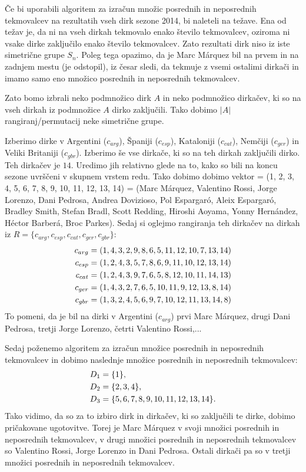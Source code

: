 \documentclass[a4paper, 12pt]{book}
\begin{document}
Če bi uporabili algoritem za izračun množic posrednih in neposrednih tekmovalcev na rezultatih vseh dirk sezone 2014, bi naleteli na težave. Ena od težav je, da ni na vseh dirkah tekmovalo enako število tekmovalcev, oziroma ni vsake dirke zaključilo enako število tekmovalcev. Zato rezultati dirk niso iz iste simetrične grupe $S_n$. Poleg tega opazimo, da je Marc Márquez bil na prvem in na zadnjem mestu (je odstopil), iz česar sledi, da tekmuje z vsemi ostalimi dirkači in imamo samo eno množico posrednih in neposrednih tekmovalcev.

Zato bomo izbrali neko podmnožico dirk $A$ in neko podmnožico dirkačev, ki so na vseh dirkah iz podmnožice $A$ dirko zaključili. Tako dobimo $|A|$ rangiranj/permutacij neke simetrične grupe.

Izberimo dirke v Argentini ($c_{arg}$), Španiji ($c_{esp}$), Kataloniji ($c_{cat}$), Nemčiji ($c_{ger}$) in Veliki Britaniji ($c_{gbr}$). Izberimo še vse dirkače, ki so na teh dirkah zaključili dirko. Teh dirkačev je $14$. Uredimo jih relativno glede na to, kako so bili na koncu sezone uvrščeni v skupnem vrstem redu. Tako dobimo dobimo vektor = (1, 2, 3, 4, 5, 6, 7, 8, 9, 10, 11, 12, 13, 14) = (Marc Márquez, Valentino Rossi, Jorge Lorenzo, Dani Pedrosa, Andrea Dovizioso, Pol Espargaró, Aleix Espargaró, Bradley Smith, Stefan Bradl, Scott Redding, Hiroshi Aoyama, Yonny Hernández, Héctor Barberá, Broc Parkes). Sedaj si oglejmo rangiranja teh dirkačev na dirkah iz $R = \{ c_{arg}, c_{esp}, c_{cat}, c_{ger}, c_{gbr} \}$:
\begin{align}
    c_{arg} &= (1, 4, 3, 2, 9, 8, 6, 5, 11, 12, 10, 7, 13, 14) \notag\\
    c_{esp} &= (1, 2, 4, 3, 5, 7, 8, 6, 9, 11, 10, 12, 13, 14) \notag\\
    c_{cat} &= (1, 2, 4, 3, 9, 7, 6, 5, 8, 12, 10, 11, 14, 13) \notag\\
    c_{ger} &= (1, 4, 3, 2, 7, 6, 5, 10, 11, 9, 12, 13, 8, 14) \notag\\
    c_{gbr} &= (1, 3, 2, 4, 5, 6, 9, 7, 10, 12, 11, 13, 14, 8) \notag
\end{align}
To pomeni, da je bil na dirki v Argentini ($c_{arg}$) prvi Marc Márquez, drugi Dani Pedrosa, tretji Jorge Lorenzo, četrti Valentino Rossi,...

Sedaj poženemo algoritem za izračun množice posrednih in neposrednih tekmovalcev in dobimo naslednje množice posrednih in neposrednih tekmovalcev:
\begin{align}
    D_1 &= \{ 1 \},  \notag\\
    D_2 &= \{ 2, 3, 4 \}, \notag\\
    D_3 &= \{ 5, 6, 7, 8, 9, 10, 11, 12, 13, 14 \}. \notag
\end{align}
Tako vidimo, da so za to izbiro dirk in dirkačev, ki so zaključili te dirke, dobimo pričakovane ugotovitve. Torej je Marc Márquez v svoji množici posrednih in neposrednih tekmovalcev, v drugi množici posrednih in neposrednih tekmovalcev so Valentino Rossi, Jorge Lorenzo in Dani Pedrosa. Ostali dirkači pa so v tretji množici posrednih in neposrednih tekmovalcev.
\end{document}
